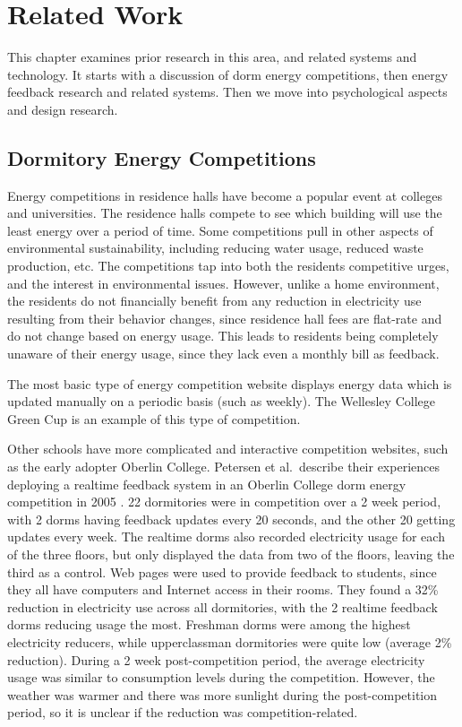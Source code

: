 \chapter{Related Work}
\label{cha:related-work}

This chapter examines prior research in this area, and related systems and technology. It starts with a discussion of dorm energy competitions, then energy feedback research and related systems. Then we move into psychological aspects and design research. 

\section{Dormitory Energy Competitions}
\label{sec:dorm-energy-competitions}

Energy competitions in residence halls have become a popular event at colleges and universities. The residence halls compete to see which building will use the least energy over a period of time. Some competitions pull in other aspects of environmental sustainability, including reducing water usage, reduced waste production, etc. The competitions tap into both the residents competitive urges, and the interest in environmental issues. However, unlike a home environment, the residents do not financially benefit from any reduction in electricity use resulting from their behavior changes, since residence hall fees are flat-rate and do not change based on energy usage. This leads to residents being completely unaware of their energy usage, since they lack even a monthly bill as feedback.

The most basic type of energy competition website displays energy data which is updated manually on a periodic basis (such as weekly). The Wellesley College Green Cup \cite{wellesley-green-cup} is an example of this type of competition.

Other schools have more complicated and interactive competition websites, such as the early adopter Oberlin College. Petersen et al.\ describe their experiences deploying a realtime feedback system in an Oberlin College dorm energy competition in 2005 \cite{petersen-dorm-energy-reduction}. 22 dormitories were in competition over a 2 week period, with 2 dorms having feedback updates every 20 seconds, and the other 20 getting updates every week. The realtime dorms also recorded electricity usage for each of the three floors, but only displayed the data from two of the floors, leaving the third as a control. Web pages were used to provide feedback to students, since they all have computers and Internet access in their rooms. They found a 32\% reduction in electricity use across all dormitories, with the 2 realtime feedback dorms reducing usage the most. Freshman dorms were among the highest electricity reducers, while upperclassman dormitories were quite low (average 2\% reduction). During a 2 week post-competition period, the average electricity usage was similar to consumption levels during the competition. However, the weather was warmer and there was more sunlight during the post-competition period, so it is unclear if the reduction was competition-related.

